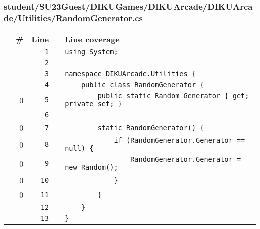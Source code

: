 \documentclass[a4paper,landscape,10pt]{article}
\begin{document}
\subsubsection{student/SU23Guest/DIKUGames/DIKUArcade/DIKUArcade/Utilities/RandomGenerator.cs}
\begin{longtable}[l]{lrrll}
\textbf{} & \textbf{\#} & \textbf{Line} & \textbf{} & \textbf{Line coverage}\\
\cellcolor{gray} &  & \verb~1~ & & \verb~using System;~\\
\cellcolor{gray} &  & \verb~2~ & & \verb~~\\
\cellcolor{gray} &  & \verb~3~ & & \verb~namespace DIKUArcade.Utilities {~\\
\cellcolor{gray} &  & \verb~4~ & & \verb~    public class RandomGenerator {~\\
\cellcolor{red} & 0 & \verb~5~ & & \verb~        public static Random Generator { get; private set; }~\\
\cellcolor{gray} &  & \verb~6~ & & \verb~~\\
\cellcolor{red} & 0 & \verb~7~ & & \verb~        static RandomGenerator() {~\\
\cellcolor{red} & 0 & \verb~8~ & & \verb~            if (RandomGenerator.Generator == null) {~\\
\cellcolor{red} & 0 & \verb~9~ & & \verb~                RandomGenerator.Generator = new Random();~\\
\cellcolor{red} & 0 & \verb~10~ & & \verb~            }~\\
\cellcolor{red} & 0 & \verb~11~ & & \verb~        }~\\
\cellcolor{gray} &  & \verb~12~ & & \verb~    }~\\
\cellcolor{gray} &  & \verb~13~ & & \verb~}~\\
\end{longtable}
\end{document}

